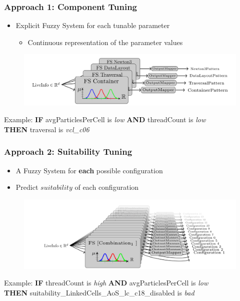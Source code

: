 \documentclass[
	10pt,
	t		%
]{beamer}
\begin{document}
\begin{frame}
	\frametitle{Approach 1: Component Tuning}
	\begin{itemize}
		\item Explicit Fuzzy System for each tunable parameter
		      \begin{itemize}
			      \item Continuous representation of the parameter values
		      \end{itemize}
	\end{itemize}
	
	\begin{figure}
		\centering
		\includegraphics[width=1\textwidth]{figures/component-approach.png}
	\end{figure}
	
	\begin{itemize}
		{\small
		\item Example: \textbf{IF} avgParticlesPerCell is \textit{low} \textbf{AND} threadCount is \textit{low}\\ \qquad  \qquad \qquad  \textbf{THEN} traversal is \textit{vcl\_c06}
		      }
	\end{itemize}
	
	
\end{frame}


\begin{frame}
	\frametitle{Approach 2: Suitability Tuning}
	\begin{itemize}
		\item A Fuzzy System for \textbf{each} possible configuration
		\item Predict $suitability$ of each configuration
	\end{itemize}
	
	\begin{figure}
		\centering
		\includegraphics[width=1\textwidth]{figures/suitability-approach.png}
	\end{figure}
	
	\begin{itemize}
		{\small
		\item Example: \textbf{IF} threadCount is \textit{high} \textbf{AND} avgParticlesPerCell is \textit{low}\\ \qquad  \qquad \qquad \textbf{THEN} suitability\_LinkedCells\_AoS\_lc\_c18\_disabled is \textit{bad}
		      }
	\end{itemize}
	
\end{frame}
\end{document}
